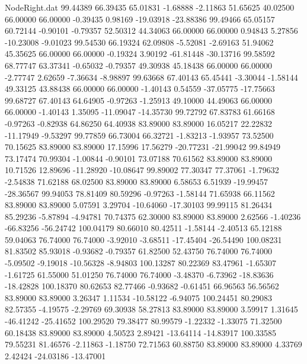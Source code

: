 \begin{filecontents}{NodeRight.dat}
  99.44389   66.39435   65.01831    -1.68888   -2.11863   51.65625   40.02500   66.00000   66.00000   -0.39435    0.98169  -19.03918  -23.88386
  99.49466   65.05157   60.72144    -0.90101   -0.79357   52.50312   44.34063   66.00000   66.00000    0.94843    5.27856  -10.23008   -9.01023
  99.54530   66.19324   62.09808    -5.52081   -2.69163   51.94062   45.35625   66.00000   66.00000   -0.19324    3.90192  -61.81448  -30.13716
  99.58592   68.77747   63.37341    -0.65032   -0.79357   49.30938   45.18438   66.00000   66.00000   -2.77747    2.62659   -7.36634   -8.98897
  99.63668   67.40143   65.45441    -3.30044   -1.58144   49.33125   43.88438   66.00000   66.00000   -1.40143    0.54559  -37.05775  -17.75663
  99.68727   67.40143   64.64905    -0.97263   -1.25913   49.10000   44.49063   66.00000   66.00000   -1.40143    1.35095  -11.09047  -14.35730
  99.72792   67.83783   61.66168    -0.97263   -0.82938   64.86250   64.40938   83.89000   83.89000   16.05217   22.22832  -11.17949   -9.53297
  99.77859   66.73004   66.32721    -1.83213   -1.93957   73.52500   70.15625   83.89000   83.89000   17.15996   17.56279  -20.77231  -21.99042
  99.84949   73.17474   70.99304    -1.00844   -0.90101   73.07188   70.61562   83.89000   83.89000   10.71526   12.89696  -11.28920  -10.08647
  99.89002   77.30347   77.37061    -1.79632   -2.54838   71.62188   68.02500   83.89000   83.89000    6.58653    6.51939  -19.99457  -28.36567
  99.94053   78.81409   80.59296    -0.97263   -1.58144   71.65938   66.11562   83.89000   83.89000    5.07591    3.29704  -10.64060  -17.30103
  99.99115   81.26434   85.29236    -5.87894   -4.94781   70.74375   62.30000   83.89000   83.89000    2.62566   -1.40236  -66.83256  -56.24742
 100.04179   80.66010   80.42511    -1.58144   -2.40513   65.12188   59.04063   76.74000   76.74000   -3.92010   -3.68511  -17.45404  -26.54490
 100.08231   81.83502   85.93018    -0.93682   -0.79357   61.82500   52.43750   76.74000   76.74000   -5.09502   -9.19018  -10.56328   -8.94803
 100.13287   80.22369   83.47961    -1.65307   -1.61725   61.55000   51.01250   76.74000   76.74000   -3.48370   -6.73962  -18.83636  -18.42828
 100.18370   80.62653   82.77466    -0.93682   -0.61451   66.96563   56.56562   83.89000   83.89000    3.26347    1.11534  -10.58122   -6.94075
 100.24451   80.29083   82.57355    -4.19575   -2.29769   69.30938   58.27813   83.89000   83.89000    3.59917    1.31645  -46.41242  -25.41652
 100.29520   79.38477   80.99579    -1.22332   -1.33075   71.32500   60.18438   83.89000   83.89000    4.50523    2.89421  -13.64114  -14.83917
 100.33585   79.55231   81.46576    -2.11863   -1.18750   72.71563   60.88750   83.89000   83.89000    4.33769    2.42424  -24.03186  -13.47001

\end{filecontents}
